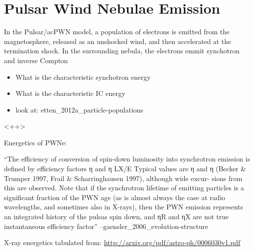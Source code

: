\section{Pulsar Wind Nebulae Emission}

In the Pulsar/ac{PWN} model, a population of electrons
is emitted from the magnetosphere, released as an unshocked wind,
and then accelerated at the termination shock. In the surrounding
nebula, the electrons emmit synchotron and inverse Compton

\begin{itemize}
  \item What is the characteristic synchotron energy
  \item What is the characteristic \ac{IC} energy
  \item look at: etten\_2012a\_particle-populations
\end{itemize}<++>




Energetics of PWNe:

``The efficiency of conversion of spin-down luminosity into synchrotron
emission is defined by efficiency factors η and
η LX/E  Typical values are η
and η (Becker \& Trumper 1997, Frail
\& Scharringhausen 1997), although wide excur- sions from this are
observed. Note that if the synchrotron lifetime of emitting particles is
a significant fraction of the PWN age (as is almost always the case at
radio wavelengths, and sometimes also in X-rays), then the PWN emission
represents an integrated history of the pulsas spin down,
and ηR and ηX are not true instantaneous efficiency factor'' --gaensler\_2006\_evolution-structure

X-ray energetics tabulated from: \url{http://arxiv.org/pdf/astro-ph/0006030v1.pdf}
